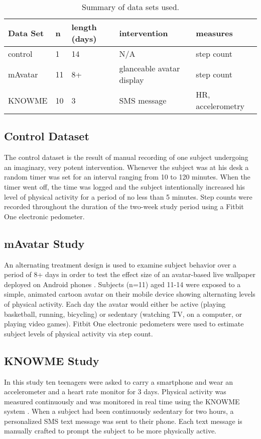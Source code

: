 \noindent
\begin{table}[H]
\resizebox{\columnwidth}{!} {
    \begin{tabular}{ l       |      l  |  p{1cm}      | l | l }
		  Data Set        & n  & length (days) & intervention    & measures \\
		  \hline
		  control         & 1  & 14 & N/A                       & step count         \\
		  mAvatar         & 11 & 8+ & glanceable avatar display & step count         \\
		  KNOWME          & 10 & 3  & SMS message               & HR, accelerometry  \\
    \end{tabular}
}
\caption {Summary of data sets used.}
\end{table}

\subsection{Control Dataset}
The control dataset is the result of manual recording of one subject undergoing an imaginary, very potent intervention.
Whenever the subject was at his desk a random timer was set for an interval ranging from 10 to 120 minutes.
When the timer went off, the time was logged and the subject intentionally increased his level of physical activity for a period of no less than 5 minutes.
Step counts were recorded throughout the duration of the two-week study period using a Fitbit One electronic pedometer.

\subsection{mAvatar Study}
An alternating treatment design is used to examine subject behavior over a period of 8+ days in order to test the effect size of an avatar-based live wallpaper deployed on Android phones \cite{murray2013}.
Subjects (n=11) aged 11-14 were exposed to a simple, animated cartoon avatar on their mobile device showing alternating levels of physical activity.
Each day the avatar would either be active (playing basketball, running, bicycling) or sedentary (watching TV, on a computer, or playing video games).
Fitbit One electronic pedometers were used to estimate subject levels of physical activity via step count.

\subsection{KNOWME Study}
In this study ten teenagers were asked to carry a smartphone and wear an accelerometer and a heart rate monitor for 3 days.
Physical activity was measured continuously and was monitored in real time using the KNOWME system \cite{mitra2012}.
When a subject had been continuously sedentary for two hours, a personalized SMS text message was sent to their phone.
Each text message is manually crafted to prompt the subject to be more physically active.


